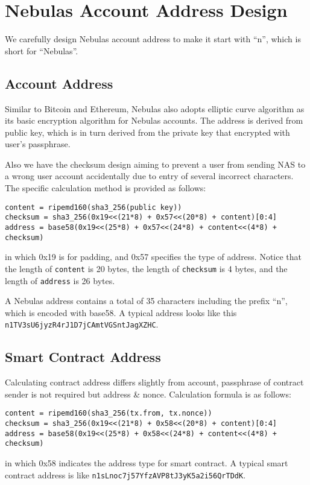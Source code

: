 \section{Nebulas Account Address Design}

We carefully design Nebulas account address to make it start with ``n'',
which
is short for ``Nebulas''.

\subsection{Account Address}

Similar to Bitcoin and Ethereum, Nebulas also adopts elliptic curve algorithm as its basic encryption algorithm for Nebulas accounts.
The address is derived from public key, which is in turn derived from the private key that encrypted with user's passphrase.

Also we have the checksum design aiming to prevent a user from sending NAS to a wrong user account accidentally due to entry of several incorrect characters.
The specific calculation method is provided as follows:

\begin{verbatim}
content = ripemd160(sha3_256(public key))
checksum = sha3_256(0x19<<(21*8) + 0x57<<(20*8) + content)[0:4]
address = base58(0x19<<(25*8) + 0x57<<(24*8) + content<<(4*8) + checksum)
\end{verbatim}
\noindent in which 0x19 is for padding, and 0x57 specifies the type of
address. Notice that the length of \texttt{content} is 20 bytes, the length of
\texttt{checksum} is 4 bytes, and the length of \texttt{address} is 26 bytes.

A Nebulas address contains a total of 35 characters including the prefix
``n'', which is encoded with base58. A typical address looks like this
\texttt{n1TV3sU6jyzR4rJ1D7jCAmtVGSntJagXZHC}.


\subsection{Smart Contract Address}
Calculating contract address differs slightly from account, passphrase of
contract sender is not required but address \& nonce.  Calculation formula is as follows:

\begin{verbatim}
content = ripemd160(sha3_256(tx.from, tx.nonce))
checksum = sha3_256(0x19<<(21*8) + 0x58<<(20*8) + content)[0:4]
address = base58(0x19<<(25*8) + 0x58<<(24*8) + content<<(4*8) + checksum)
\end{verbatim}
\noindent
in which 0x58 indicates the address type for smart contract. A typical smart
contract address is like \texttt{n1sLnoc7j57YfzAVP8tJ3yK5a2i56QrTDdK}.
